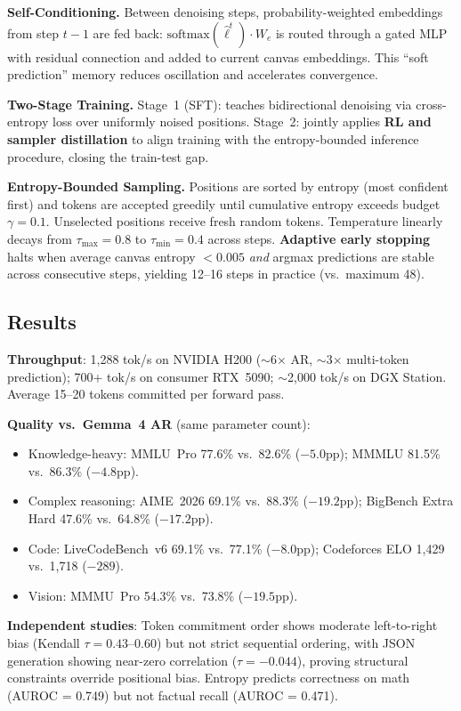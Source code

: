 \documentclass[11pt,a4paper]{article}
\begin{document}
\textbf{Self-Conditioning.} Between denoising steps, probability-weighted embeddings from step $t-1$ are fed back: $\text{softmax}(\hat{\ell}^t) \cdot W_e$ is routed through a gated MLP with residual connection and added to current canvas embeddings. This ``soft prediction'' memory reduces oscillation and accelerates convergence.

\textbf{Two-Stage Training.} Stage~1 (SFT): teaches bidirectional denoising via cross-entropy loss over uniformly noised positions. Stage~2: jointly applies \textbf{RL and sampler distillation} to align training with the entropy-bounded inference procedure, closing the train-test gap.

\textbf{Entropy-Bounded Sampling.} Positions are sorted by entropy (most confident first) and tokens are accepted greedily until cumulative entropy exceeds budget $\gamma = 0.1$. Unselected positions receive fresh random tokens. Temperature linearly decays from $\tau_{\max} = 0.8$ to $\tau_{\min} = 0.4$ across steps. \textbf{Adaptive early stopping} halts when average canvas entropy $< 0.005$ \emph{and} argmax predictions are stable across consecutive steps, yielding 12--16 steps in practice (vs.\ maximum 48).

\subsection{Results}
\textbf{Throughput}: 1,288 tok/s on NVIDIA H200 ($\sim$6$\times$ AR, $\sim$3$\times$ multi-token prediction); 700+ tok/s on consumer RTX~5090; $\sim$2,000 tok/s on DGX Station. Average 15--20 tokens committed per forward pass.

\textbf{Quality vs.\ Gemma~4 AR} (same parameter count):
\begin{itemize}
    \item Knowledge-heavy: MMLU~Pro 77.6\% vs.\ 82.6\% ($-5.0$pp); MMMLU 81.5\% vs.\ 86.3\% ($-4.8$pp).
    \item Complex reasoning: AIME~2026 69.1\% vs.\ 88.3\% ($-19.2$pp); BigBench Extra Hard 47.6\% vs.\ 64.8\% ($-17.2$pp).
    \item Code: LiveCodeBench~v6 69.1\% vs.\ 77.1\% ($-8.0$pp); Codeforces ELO 1,429 vs.\ 1,718 ($-289$).
    \item Vision: MMMU~Pro 54.3\% vs.\ 73.8\% ($-19.5$pp).
\end{itemize}

\textbf{Independent studies}: Token commitment order shows moderate left-to-right bias (Kendall $\tau = 0.43$--$0.60$) but not strict sequential ordering, with JSON generation showing near-zero correlation ($\tau = -0.044$), proving structural constraints override positional bias. Entropy predicts correctness on math (AUROC = 0.749) but not factual recall (AUROC = 0.471).
\end{document}
